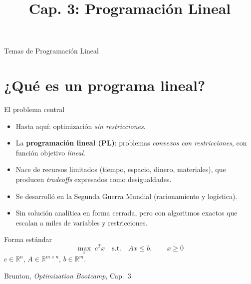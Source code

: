 \documentclass[10pt,aspectratio=169]{beamer}
\title{Cap. 3: Programación Lineal}
\newcommand{\fuente}{\vfill{\scriptsize\color{gray}Brunton, \emph{Optimization Bootcamp}, Cap.~3}}
\begin{document}

\begin{frame}
  \titlepage
\end{frame}

\begin{frame}{Temas de Programación Lineal}
  \tableofcontents
\end{frame}

\section{¿Qué es un programa lineal?}

\begin{frame}{El problema central}
  \small
  \begin{itemize}
    \item Hasta aquí: optimización \emph{sin restricciones}.
    \item La \textbf{programación lineal (PL)}: problemas \emph{convexos con restricciones},
      con función objetivo \emph{lineal}.
    \item Nace de recursos limitados (tiempo, espacio, dinero, materiales), que producen
      \emph{tradeoffs} expresados como desigualdades.
    \item Se desarrolló en la Segunda Guerra Mundial (racionamiento y logística).
    \item Sin solución analítica en forma cerrada, pero con algoritmos exactos que escalan
      a miles de variables y restricciones.
  \end{itemize}
  \begin{block}{Forma estándar}
    \[\max_x\; c^T x \quad \text{s.t.}\quad Ax \le b,\qquad x \ge 0\]
    $c \in \mathbb{R}^n$, $A \in \mathbb{R}^{m\times n}$, $b \in \mathbb{R}^m$.
  \end{block}
  \fuente
\end{frame}
\end{document}

